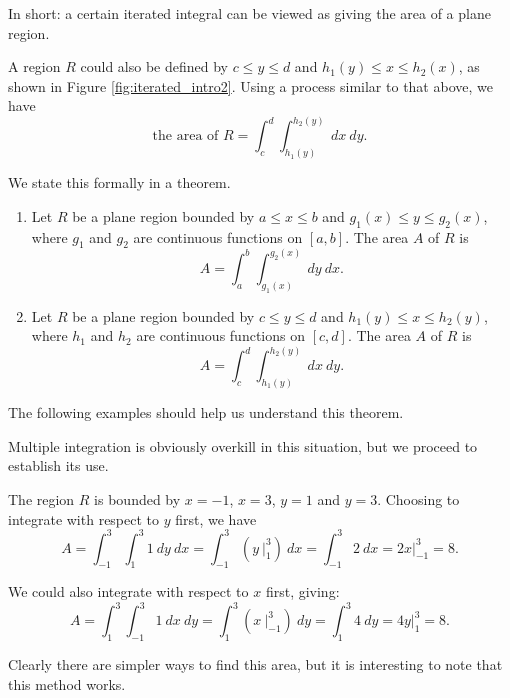 In short: a certain iterated integral can be viewed as giving the area of a plane region.

A region $R$ could also be defined by $c\leq y\leq d$ and $h_1(y)\leq x\leq h_2(x)$, as shown in Figure \ref{fig:iterated_intro2}. Using a process similar to that above, we have 
$$\text{the area of }R = \int_c^d\int_{h_1(y)}^{h_2(y)} \ dx\ dy.$$


We state this formally in a theorem.

{\begin{enumerate}
	\item Let $R$ be a plane region bounded by $a\leq x\leq b$ and $g_1(x)\leq y\leq g_2(x)$, where $g_1$ and $g_2$ are continuous functions on $[a,b]$. The area $A$ of $R$ is
	$$A = \int_a^b\int_{g_1(x)}^{g_2(x)} \ dy\ dx.$$
	\item Let $R$ be a plane region bounded by $c\leq y\leq d$ and $h_1(y)\leq x\leq h_2(y)$, where $h_1$ and $h_2$ are continuous functions on $[c,d]$. The area $A$ of $R$ is
	$$A = \int_c^d\int_{h_1(y)}^{h_2(y)} \ dx\ dy.$$
\end{enumerate}
}

The following examples should help us understand this theorem.\\

{Multiple integration is obviously overkill in this situation, but we proceed to establish its use.

The region $R$ is bounded by $x=-1$, $x=3$, $y=1$ and $y=3$. Choosing to integrate with respect to $y$ first, we have 
$$A = \int_{-1}^3\int_1^3 1\ dy\ dx = \int_{-1}^3 \left(y\ \Big|_1^3\right)\ dx = \int_{-1}^3 2\ dx = 2x\Big|_{-1}^3=8.$$

We could also integrate with respect to $x$ first, giving:
$$A = \int_1^3\int_{-1}^3 1\ dx \ dy =\int_1^3 \left(x\ \Big|_{-1}^3\right)\ dy = \int_1^3 4\ dy = 4y\Big|_1^3 = 8.$$

Clearly there are simpler ways to find this area, but it is interesting to note that this method works.
}\\

